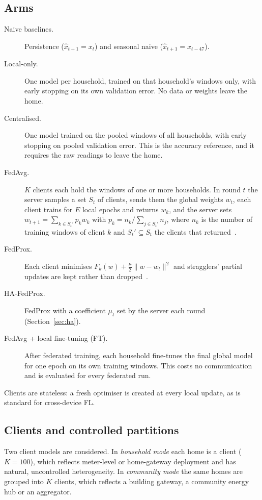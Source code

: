 \subsection{Arms}
\begin{description}
\item[Naive baselines.] Persistence ($\hat{x}_{t+1}=x_t$) and seasonal naive ($\hat{x}_{t+1}=x_{t-47}$).
\item[Local-only.] One model per household, trained on that household's windows only, with early stopping on its
own validation error. No data or weights leave the home.
\item[Centralised.] One model trained on the pooled windows of all households, with early stopping on pooled
validation error. This is the accuracy reference, and it requires the raw readings to leave the home.
\item[FedAvg.] $K$ clients each hold the windows of one or more households. In round $t$ the server samples a set
$S_t$ of clients, sends them the global weights $w_t$, each client trains for $E$ local epochs and returns $w_k$, and
the server sets $w_{t+1}=\sum_{k\in S_t'} p_k w_k$ with $p_k=n_k/\sum_{j\in S_t'} n_j$, where $n_k$ is the number of
training windows of client $k$ and $S_t'\subseteq S_t$ the clients that returned~\cite{mcmahan2017fedavg}.
\item[FedProx.] Each client minimises $F_k(w)+\frac{\mu}{2}\lVert w-w_t\rVert^2$ and stragglers' partial updates are
kept rather than dropped~\cite{li2020fedprox}.
\item[HA-FedProx.] FedProx with a coefficient $\mu_t$ set by the server each round (Section~\ref{sec:ha}).
\item[FedAvg + local fine-tuning (FT).] After federated training, each household fine-tunes the final global model
for one epoch on its own training windows. This costs no communication and is evaluated for every federated run.
\end{description}
Clients are stateless: a fresh optimiser is created at every local update, as is standard for cross-device FL.

\subsection{Clients and controlled partitions}\label{sec:partition}
Two client models are considered. In \emph{household mode} each home is a client ($K=100$), which reflects
meter-level or home-gateway deployment and has natural, uncontrolled heterogeneity. In \emph{community mode} the same
homes are grouped into $K$ clients, which reflects a building gateway, a community energy hub or an aggregator.

